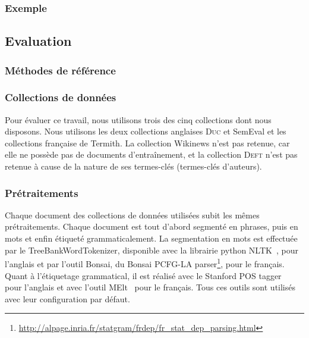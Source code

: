       \subsubsection{Exemple}
      \label{subsubsec:main-automatic_keyphrase_annotation-supervised_automatic_keyphrase_extraction-topiccorank-exemple}

    \subsection{Evaluation}
    \label{subsec:main-automatic_keyphrase_annotation-supervised_automatic_keyphrase_annotation-evaluation}
      \subsubsection{Méthodes de référence}
      \label{subsubsec:main-automatic_keyphrase_annotation-supervised_automatic_keyphrase_annotation-evaluation-baselines}

      \subsubsection{Collections de données}
      \label{subsubsec:main-automatic_keyphrase_annotation-supervised_automatic_keyphrase_annotation-evaluation-evaluation_data}
        Pour évaluer ce travail, nous utilisons trois des cinq collections dont
        nous disposons. Nous utilisons les deux collections anglaises
        \textsc{Duc} et SemEval et les collections française de Termith. La
        collection Wikinews n'est pas retenue, car elle ne possède pas de
        documents d'entraînement, et la collection \textsc{Deft} n'est pas
        retenue à cause de la nature de ses termes-clés (termes-clés d'auteurs).

      \subsubsection{Prétraitements}
      \label{subsubsec:main-automatic_keyphrase_annotation-supervised_automatic_keyphrase_annotation-evaluation-preprocessing}
        Chaque document des collections de données utilisées subit les mêmes
        prétraitements. Chaque document est tout d'abord segmenté en phrases,
        puis en mots et enfin étiqueté grammaticalement. La segmentation en mots
        est effectuée par le TreeBankWordTokenizer, disponible avec la librairie
        python NLTK~\cite[\textit{Natural Language ToolKit}]{bird2009nltk}, pour
        l'anglais et par l'outil Bonsai, du Bonsai PCFG-LA
        parser\footnote{\url{http://alpage.inria.fr/statgram/frdep/fr_stat_dep_parsing.html}},
        pour le français. Quant à l'étiquetage grammatical, il est réalisé avec
        le Stanford POS tagger~\cite{toutanova2003stanfordpostagger} pour
        l'anglais et avec l'outil MElt~\cite{denis2009melt} pour le français.
        Tous ces outils sont utilisés avec leur configuration par défaut.

